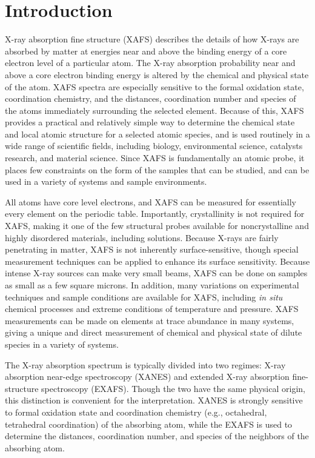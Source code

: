 \section{Introduction}

X-ray absorption fine structure (XAFS) describes the details of how X-rays
are absorbed by matter at energies near and above the binding energy of a
core electron level of a particular atom.  The X-ray absorption probability
near and above a core electron binding energy is altered by the chemical
and physical state of the atom.  XAFS spectra are especially sensitive to
the formal oxidation state, coordination chemistry, and the distances,
coordination number and species of the atoms immediately surrounding the
selected element.  Because of this, XAFS provides a practical and
relatively simple way to determine the chemical state and local atomic
structure for a selected atomic species, and is used routinely in a wide
range of scientific fields, including biology, environmental science,
catalysts research, and material science.  Since XAFS is fundamentally an
atomic probe, it places few constraints on the form of the samples that can
be studied, and can be used in a variety of systems and sample
environments.

All atoms have core level electrons, and XAFS can be measured for
essentially every element on the periodic table.  Importantly,
crystallinity is not required for XAFS, making it one of the few structural
probes available for noncrystalline and highly disordered materials,
including solutions.  Because X-rays are fairly penetrating in matter, XAFS
is not inherently surface-sensitive, though special measurement techniques
can be applied to enhance its surface sensitivity.  Because intense X-ray
sources can make very small beams, XAFS can be done on samples as small as
a few square microns.  In addition, many variations on experimental
techniques and sample conditions are available for XAFS, including
{\emph{in situ}} chemical processes and extreme conditions of temperature
and pressure.  XAFS measurements can be made on elements at trace abundance
in many systems, giving a unique and direct measurement of chemical and
physical state of dilute species in a variety of systems.

The X-ray absorption spectrum is typically divided into two regimes: X-ray
absorption near-edge spectroscopy (XANES) and extended X-ray absorption
fine-structure spectroscopy (EXAFS).  Though the two have the same physical
origin, this distinction is convenient for the interpretation. XANES is
strongly sensitive to formal oxidation state and coordination chemistry
(e.g., octahedral, tetrahedral coordination) of the absorbing atom, while
the EXAFS is used to determine the distances, coordination number, and
species of the neighbors of the absorbing atom.

